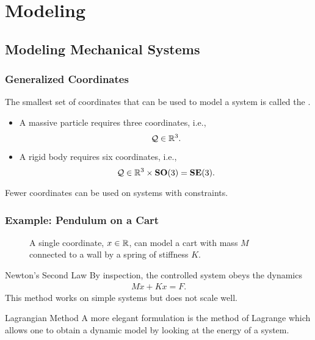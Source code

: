 \section{Modeling}
\showtoc

\subsection{Modeling Mechanical Systems}

\begin{frame}
  \frametitle{Generalized Coordinates}
  The smallest set of coordinates that can be used to model a system is called the .
\begin{itemize}
  \item A massive particle requires three coordinates, i.e., $$\mathcal{Q} \in \mathbb{R}^3.$$
  \item A rigid body requires six coordinates, i.e., $$\mathcal{Q} \in \mathbb{R}^3 \times \mathbf{SO}(3) = \mathbf{SE}(3).$$
\end{itemize}
Fewer coordinates can be used on systems with constraints.
\end{frame}


\begin{frame}
  \frametitle{Example: Pendulum on a Cart}

  \begin{figure}
    \centering
    \def\svgwidth{0.8\columnwidth}
    
    \caption{A single coordinate, $x \in \mathbb{R}$, can model a cart with mass $M$ connected to a wall by a spring of stiffness $K$.}
  \end{figure}
\end{frame}


\begin{frame}
  \begin{block}{Newton's Second Law}
    By inspection, the controlled system obeys the dynamics
    \begin{align*}
      M {\ddot x} + K x = F.
    \end{align*}
    This method works on simple systems but does not scale well.
  \end{block}
  
  \begin{block}{Lagrangian Method}
  A more elegant formulation is the method of Lagrange which allows one to obtain a dynamic model by looking at the energy of a system.
  \end{block}
\end{frame}

